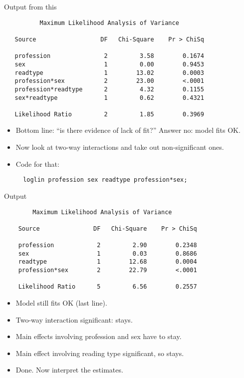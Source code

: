 \documentclass[pdf]{prosper}
\begin{document}
\begin{slide}{Output from this}

{\scriptsize
\begin{verbatim}
          Maximum Likelihood Analysis of Variance

   Source                  DF   Chi-Square    Pr > ChiSq

   profession               2         3.58        0.1674
   sex                      1         0.00        0.9453
   readtype                 1        13.02        0.0003
   profession*sex           2        23.00        <.0001
   profession*readtype      2         4.32        0.1155
   sex*readtype             1         0.62        0.4321

   Likelihood Ratio         2         1.85        0.3969

\end{verbatim}
}

\begin{itemize}
\item Bottom line: ``is there evidence of lack of fit?'' Answer no: model fits OK.
\item Now look at two-way interactions and take out non-significant ones.
\item Code for that:

\begin{verbatim}
  loglin profession sex readtype profession*sex;
\end{verbatim}
\end{itemize}
  
\end{slide}

\begin{slide}{Output}

{\scriptsize
\begin{verbatim}
        Maximum Likelihood Analysis of Variance

    Source               DF   Chi-Square    Pr > ChiSq

    profession            2         2.90        0.2348
    sex                   1         0.03        0.8686
    readtype              1        12.68        0.0004
    profession*sex        2        22.79        <.0001

    Likelihood Ratio      5         6.56        0.2557

\end{verbatim}
}

\begin{itemize}
\item Model still fits OK (last line).
\item Two-way interaction significant: stays.
\item Main effects involving profession and sex have to stay.
\item Main effect involving reading type significant, so stays.
\item Done. Now interpret the estimates.
\end{itemize}
  
\end{slide}
\end{document}
